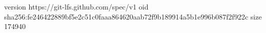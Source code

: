 version https://git-lfs.github.com/spec/v1
oid sha256:fe246422889bf5e2c51c0faaa864620aab72f9b189914a5b1e996b087f2f922c
size 174940
